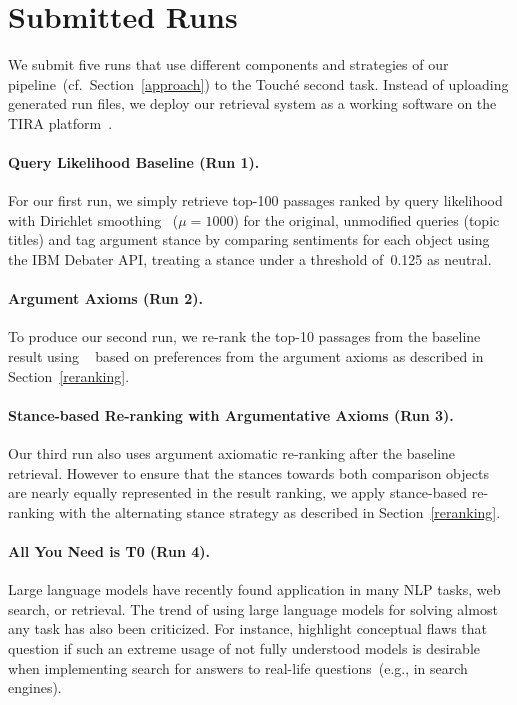 \section{Submitted Runs}
\label{runs}

We submit five runs that use different components and strategies of our pipeline~(cf.\ Section~\ref{approach}) to the Touch{\'e} second task.
Instead of uploading generated run files, we deploy our retrieval system as a working software on the TIRA platform~\cite{PotthastGWS2019}.

\paragraph{Query Likelihood Baseline (Run 1).}

For our first run, we simply retrieve top-100 passages ranked by query likelihood with Dirichlet smoothing~\cite{ZhaiL2001} (\(\mu = 1000\)) for the original, unmodified queries (topic titles) and tag argument stance by comparing sentiments for each object using the IBM Debater API, treating a stance under a threshold of~0.125 as neutral.

\paragraph{Argument Axioms (Run 2).}

To produce our second run, we re-rank the top-10 passages from the baseline result using \KwikSort~\cite{BondarenkoFRSVH2022,HagenVGS2016} based on preferences from the argument axioms as described in Section~\ref{reranking}.

\paragraph{Stance-based Re-ranking with Argumentative Axioms (Run 3).}

Our third run also uses argument axiomatic re-ranking after the baseline retrieval. However to ensure that the stances towards both comparison objects are nearly equally represented in the result ranking, we apply stance-based re-ranking with the alternating stance strategy as described in Section~\ref{reranking}.

\paragraph{All You Need is T0 (Run 4).}

Large language models have recently found application in many NLP tasks, web search, or retrieval. The trend of using large language models for solving almost any task has also been criticized. For instance, \citet{ShahB2022} highlight conceptual flaws that question if such an extreme usage of not fully understood models is desirable when implementing search for answers to real-life questions~(e.g., in search engines).

